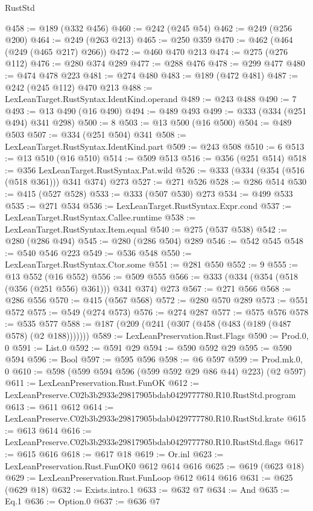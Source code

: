 \begin{lexlean}{RustStd}
\begin{coremodule}
@458 := @189 (@332 @456)
@460 := @242 (@245 @54)
@462 := @249 (@256 @200)
@464 := @249 (@263 @213)
@465 := @250 @359
@470 := @462 (@464 (@249 (@465 @217) @266))
@472 := @460 @470 @213
@474 := @275 (@276 @112)
@476 := @280 @374 @289
@477 := @288 @476
@478 := @299 @477
@480 := @474 @478 @223
@481 := @274 @480
@483 := @189 (@472 @481)
@487 := @242 (@245 @112) @470 @213
@488 := LexLeanTarget.RustSyntax.IdentKind.operand
@489 := @243 @488
@490 := 7
@493 := @13 @490 (@16 @490)
@494 := @489 @493
@499 := @333 (@334 (@251 @494) @341 @298)
@500 := 8
@503 := @13 @500 (@16 @500)
@504 := @489 @503
@507 := @334 (@251 @504) @341
@508 := LexLeanTarget.RustSyntax.IdentKind.part
@509 := @243 @508
@510 := 6
@513 := @13 @510 (@16 @510)
@514 := @509 @513
@516 := @356 (@251 @514)
@518 := @356 LexLeanTarget.RustSyntax.Pat.wild
@526 := @333 (@334 (@354 (@516 (@518 @361))) @341 @374) @273
@527 := @271 @526
@528 := @286 @514
@530 := @415 (@527 @528)
@533 := @333 (@507 @530) @273
@534 := @499 @533
@535 := @271 @534
@536 := LexLeanTarget.RustSyntax.Expr.cond
@537 := LexLeanTarget.RustSyntax.Callee.runtime
@538 := LexLeanTarget.RustSyntax.Item.equal
@540 := @275 (@537 @538)
@542 := @280 (@286 @494)
@545 := @280 (@286 @504) @289
@546 := @542 @545
@548 := @540 @546 @223
@549 := @536 @548
@550 := LexLeanTarget.RustSyntax.Ctor.some
@551 := @281 @550
@552 := 9
@555 := @13 @552 (@16 @552)
@556 := @509 @555
@566 := @333 (@334 (@354 (@518 (@356 (@251 @556) @361))) @341 @374) @273
@567 := @271 @566
@568 := @286 @556
@570 := @415 (@567 @568)
@572 := @280 @570 @289
@573 := @551 @572
@575 := @549 (@274 @573)
@576 := @274 @287
@577 := @575 @576
@578 := @535 @577
@588 := @187 (@209 (@241 (@307 (@458 (@483 (@189 (@487 @578) (@2 @188)))))))
@589 := LexLeanPreservation.Rust.Flags
@590 := Prod.{0, 0}
@591 := List.{0}
@592 := @591 @29
@594 := @590 @592 @29
@595 := @590 @594
@596 := Bool
@597 := @595 @596
@598 := @6 @597
@599 := Prod.mk.{0, 0}
@610 := @598 (@599 @594 @596 (@599 @592 @29 @86 @44) @223) (@2 @597)
@611 := LexLeanPreservation.Rust.FunOK
@612 := LexLeanPreserve.C02b3b2933e29817905bdab0429777780.R10.RustStd.program
@613 := @611 @612
@614 := LexLeanPreserve.C02b3b2933e29817905bdab0429777780.R10.RustStd.krate
@615 := @613 @614
@616 := LexLeanPreserve.C02b3b2933e29817905bdab0429777780.R10.RustStd.flags
@617 := @615 @616
@618 := @617 @18
@619 := Or.inl
@623 := LexLeanPreservation.Rust.FunOK0 @612 @614 @616
@625 := @619 (@623 @18)
@629 := LexLeanPreservation.Rust.FunLoop @612 @614 @616
@631 := @625 (@629 @18)
@632 := Exists.intro.{1}
@633 := @632 @7
@634 := And
@635 := Eq.{1}
@636 := Option.{0}
@637 := @636 @7

\end{coremodule}
\end{lexlean}
